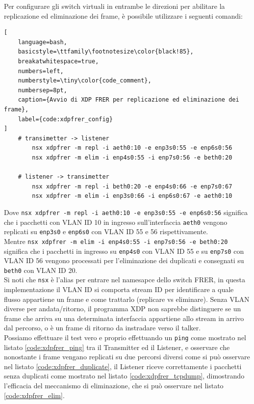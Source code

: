 \documentclass[12pt,a4paper,twoside]{book}
\begin{document}
\begin{onehalfspace}
Per configurare gli switch virtuali in entrambe le direzioni per abilitare la replicazione ed eliminazione dei frame, è possibile utilizzare i seguenti comandi:

\begin{lstlisting}[
    language=bash,
    basicstyle=\ttfamily\footnotesize\color{black!85},
    breakatwhitespace=true,
    numbers=left,
    numberstyle=\tiny\color{code_comment},
    numbersep=8pt,
    caption={Avvio di XDP FRER per replicazione ed eliminazione dei frame},
    label={code:xdpfrer_config}
]
    # transimetter -> listener
        nsx xdpfrer -m repl -i aeth0:10 -e enp3s0:55 -e enp6s0:56
        nsx xdpfrer -m elim -i enp4s0:55 -i enp7s0:56 -e beth0:20

    # listener -> transimetter
        nsx xdpfrer -m repl -i beth0:20 -e enp4s0:66 -e enp7s0:67
        nsx xdpfrer -m elim -i enp3s0:66 -i enp6s0:67 -e aeth0:10
\end{lstlisting}

Dove \texttt{nsx xdpfrer -m repl -i aeth0:10 -e enp3s0:55 -e enp6s0:56} significa che i pacchetti con VLAN ID 10 in ingresso sull'interfaccia \texttt{aeth0} vengono replicati su \texttt{enp3s0} e \texttt{enp6s0} con VLAN ID 55 e 56 rispettivamente.
\\
Mentre \texttt{nsx xdpfrer -m elim -i enp4s0:55 -i enp7s0:56 -e beth0:20} significa che i pacchetti in ingresso su \texttt{enp4s0} con VLAN ID 55 e su \texttt{enp7s0} con VLAN ID 56 vengono processati per l'eliminazione dei duplicati e consegnati su \texttt{beth0} con VLAN ID 20.
\\
Si noti che \texttt{nsx} è l'alias per entrare nel namesapce dello switch FRER, in questa implementazione il VLAN ID si comporta stream ID per identificare a quale flusso appartiene un frame e come trattarlo (replicare vs eliminare). Senza VLAN diverse per andata/ritorno, il programma XDP non saprebbe distinguere se un frame che arriva su una determinata interfaccia appartiene allo stream in arrivo dal percorso, o è un frame di ritorno da instradare verso il talker.
\\
Possiamo effettuare il test vero e proprio effettuando un \texttt{ping} come mostrato nel listato \ref{code:xdpfrer_ping} tra il Transmitter ed il Listener, e osservare che nonostante i frame vengano replicati su due percorsi diversi come si può osservare nel listato \ref{code:xdpfrer_duplicate}, il Listener riceve correttamente i pacchetti senza duplicati come mostrato nel listato \ref{code:xdpfrer_tcpdump}, dimostrando l'efficacia del meccanismo di eliminazione, che si può osservare nel listato \ref{code:xdpfrer_elim}.


\end{onehalfspace}
\end{document}
